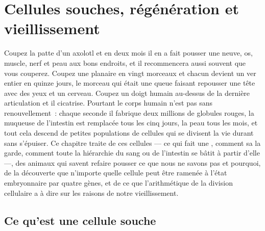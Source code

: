 \chapter{Cellules souches, régénération et vieillissement}\label{ch:b3:stem-cells}

Coupez la patte d'un axolotl et en deux mois il en a fait pousser une
neuve, os, muscle, nerf et peau aux bons endroits, et il recommencera
aussi souvent que vous couperez. Coupez une planaire en vingt morceaux
et chacun devient un ver entier en quinze jours, le morceau qui était
une queue faisant repousser une tête avec des yeux et un cerveau.
Coupez un doigt humain au-dessus de la dernière articulation et il
cicatrise. Pourtant le corps humain n'est pas sans renouvellement~:
chaque seconde il fabrique deux millions de globules rouges, la muqueuse
de l'intestin est remplacée tous les cinq jours, la peau tous les mois,
et tout cela descend de petites populations de cellules qui se divisent
la vie durant sans s'épuiser. Ce chapitre traite de ces cellules --- ce
qui fait une , comment sa  la garde, comment toute la
hiérarchie du sang ou de l'intestin se bâtit à partir d'elle ---, des
animaux qui savent refaire pousser ce que nous ne savons pas et pourquoi,
de la découverte que n'importe quelle cellule peut être ramenée à l'état
embryonnaire par quatre gènes, et de ce que l'arithmétique de la division
cellulaire a à dire sur les raisons de notre vieillissement.

\section{Ce qu'est une cellule souche}

